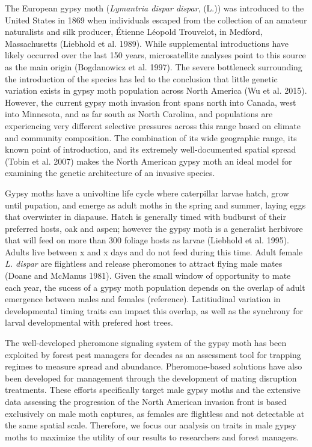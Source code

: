 \documentclass[fleqn,11pt]{wlpeerj}
\begin{document}
The European gypsy moth (\textit{Lymantria dispar dispar}, (L.)) was introduced to the United States in 1869 when individuals escaped from the collection of an amateur naturalists and silk producer, Étienne Léopold Trouvelot, in Medford, Massachusetts (Liebhold et al. 1989). While supplemental introductions have likely occurred over the last 150 years, microsatellite analyses point to this source as the main origin (Bogdanowicz et al. 1997). The severe bottleneck surrounding the introduction of the species has led to the conclusion that little genetic variation exists in gypsy moth population across North America (Wu et al. 2015). However, the current gypsy moth invasion front spans north into Canada, west into Minnesota, and as far south as North Carolina, and populations are experiencing very different selective pressures across this range based on climate and community composition. The combination of its wide geographic range, its known point of introduction, and its extremely well-documented spatial spread (Tobin et al. 2007) makes the North American gypsy moth an ideal model for examining the genetic architecture of an invasive species.

Gypsy moths have a univoltine life cycle where caterpillar larvae hatch, grow until pupation, and emerge as adult moths in the spring and summer, laying eggs that overwinter in diapause. Hatch is generally timed with budburst of their preferred hosts, oak and aspen; however the gypsy moth is a generalist herbivore that will feed on more than 300 foliage hosts as larvae (Liebhold et al. 1995). Adults live between x and x days and do not feed during this time. Adult female \textit{L. dispar} are flightless and release pheromones to attract flying male mates (Doane and McManus 1981). Given the small window of opportunity to mate each year, the sucess of a gypsy moth population depends on the overlap of adult emergence between males and females (reference). Latitiudinal variation in developmental timing traits can impact this overlap, as well as the synchrony for larval developmental with prefered host trees.

The well-developed pheromone signaling system of the gypsy moth has been exploited by forest pest managers for decades as an assessment tool for trapping regimes to measure spread and abundance. Pheromone-based solutions have also been developed for management through the development of mating disruption treatments. These efforts specifically target male gypsy moths and the extensive data assessing the progression of the North American invasion front is based exclusively on male moth captures, as females are flightless and not detectable at the same spatial scale. Therefore, we focus our analysis on traits in male gypsy moths to maximize the utility of our results to researchers and forest managers.
\end{document}
